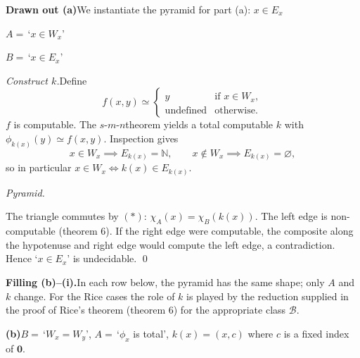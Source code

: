 \documentclass[fleqn]{article}
\newcommand{\SMN}{$s$\nobreakdash-$m$\nobreakdash-$n$}
\begin{document}
\bigskip

\noindent\textbf{Drawn out (a)}\quad We instantiate the pyramid for part (a): $x \in E_x$

\smallskip

$A = \,$`$x \in W_x$'

$B = \,$`$x \in E_x$'

\medskip

\textit{Construct $k$.}\quad Define
\[
f(x, y) \simeq
\begin{cases}
y & \text{if } x \in W_x, \\
\text{undefined} & \text{otherwise.}
\end{cases}
\]
$f$ is computable. The \SMN theorem yields a total computable $k$ with $\phi_{k(x)}(y) \simeq f(x, y)$. Inspection gives
\[
x \in W_x \implies E_{k(x)} = \mathbb{N}, \qquad x \notin W_x \implies E_{k(x)} = \varnothing,
\]
so in particular $x \in W_x \iff k(x) \in E_{k(x)}$.

\medskip

\textit{Pyramid.}

\begin{center}
\end{center}

The triangle commutes by $(*)$: $\chi_A(x) = \chi_B(k(x))$. The left edge is non-computable (theorem 6). If the right edge were computable, the composite along the hypotenuse and right edge would compute the left edge, a contradiction. Hence `$x \in E_x$' is undecidable. \qed

\bigskip

\noindent\textbf{Filling (b)--(i).}\quad In each row below, the pyramid has the same shape; only $A$ and $k$ change. For the Rice cases the role of $k$ is played by the reduction supplied in the proof of Rice's theorem (theorem 6) for the appropriate class $\mathscr{B}$.

\medskip

\noindent\textbf{(b)}\quad $B = \,$`$W_x = W_y$', $A = \,$`$\phi_x$ is total', $k(x) = (x, c)$ where $c$ is a fixed index of $\mathbf{0}$.
\end{document}
